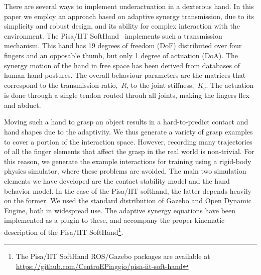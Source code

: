 
There are several ways to implement underactuation in a dexterous hand. In this paper we employ an approach based on adaptive synergy transmission, due to its simplicity and robust design, and its ability for complex interaction with the environment. The Pisa/IIT SoftHand~\cite{Catalano2014Adaptive} implements such a transmission mechanism. This hand has 19 degrees of freedom (DoF) distributed over four fingers and an opposable thumb, but only 1 degree of actuation (DoA). The synergy motion of the hand in free space has been derived from databases of human hand postures. The overall behaviour parameters are the matrices that correspond to the transmission ratio,~$R$, to the joint stiffness,~$K_q$. The actuation is done through a single tendon routed throuh all joints, making the fingers flex and abduct.


Moving such a hand to grasp an object results in a hard-to-predict contact and hand shapes due to the adaptivity. We thus generate a variety of grasp examples to cover a portion of the interaction space. However, recording many trajectories of all the finger elements that affect the grasp in the real world is non-trivial. For this reason, we generate the example interactions for training using a rigid-body physics simulator, where these problems are avoided. The main two simulation elements we have developed are the contact stability model and the hand behavior model. In the case of the Pisa/IIT softhand, the latter depends heavily on the former. We used the standard distribution of Gazebo and Open Dynamic Engine, both in widespread use. The adaptive synergy equations have been implemented as a plugin to these, and accompany the proper kinematic description of the Pisa/IIT SoftHand\footnote{The Pisa/IIT SoftHand ROS/Gazebo packages are available at \url{https://github.com/CentroEPiaggio/pisa-iit-soft-hand}}.

